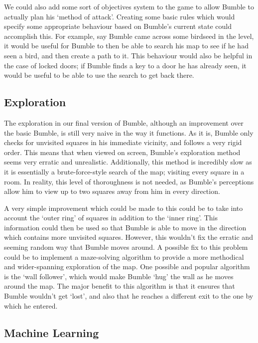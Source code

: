 \documentclass[a4paper,oneside]{report}
\begin{document}
We could also add some sort of objectives system to the game to allow Bumble to actually plan his `method of attack'. Creating some basic rules which would specify some appropriate behaviour based on Bumble's current state could accomplish this. For example, say Bumble came across some birdseed in the level, it would be useful for Bumble to then be able to search his map to see if he had seen a bird, and then create a path to it. This behaviour would also be helpful in the case of locked doors; if Bumble finds a key to a door he has already seen, it would be useful to be able to use the search to get back there.

\subsection{Exploration}

The exploration in our final version of Bumble, although an improvement over the basic Bumble, is still very naive in the way it functions. As it is, Bumble only checks for unvisited squares in his immediate vicinity, and follows a very rigid order. This means that when viewed on screen, Bumble's exploration method seems very erratic and unrealistic. Additionally, this method is incredibly slow as it is essentially a brute-force-style search of the map; visiting every square in a room. In reality, this level of thoroughness is not needed, as Bumble's perceptions allow him to view up to two squares away from him in every direction. 

A very simple improvement which could be made to this could be to take into account the `outer ring' of squares in addition to the `inner ring'. This information could then be used so that Bumble is able to move in the direction which contains more unvisited squares. However, this wouldn't fix the erratic and seeming random way that Bumble moves around. A possible fix to this problem could be to implement a maze-solving algorithm to provide a more methodical and wider-spanning exploration of the map. One possible and popular algorithm is the `wall follower', which would make Bumble `hug' the wall as he moves around the map. The major benefit to this algorithm is that it ensures that Bumble wouldn't get `lost', and also that he reaches a different exit to the one by which he entered.

\subsection{Machine Learning}
\end{document}
